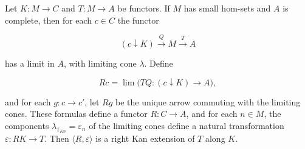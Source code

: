 Let $K: M \to C$ and $T: M \to A$ be functors. If $M$ has small hom-sets and $A$ is complete, then for each $c \in C$ the functor

$$(c \downarrow K) \xrightarrow{Q} M \xrightarrow{T} A$$

has a limit in $A$, with limiting cone $\lambda$. Define

$$Rc = \lim\bigl(TQ: (c \downarrow K) \to A\bigr),$$

and for each $g: c \to c'$, let $Rg$ be the unique arrow commuting with the limiting cones. These formulas define a functor $R: C \to A$, and for each $n \in M$, the components $\lambda_{1_{Kn}} = \varepsilon_n$ of the limiting cones define a natural transformation $\varepsilon: RK \to T$. Then $\langle R, \varepsilon \rangle$ is a right Kan extension of $T$ along $K$.
